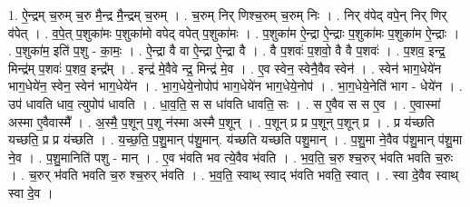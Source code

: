 \documentclass[17pt]{extarticle}
\begin{document}
1. ऐ॒न्द्रम् च॒रुम् च॒रु मै॒न्द्र मै॒न्द्रम् च॒रुम् । . च॒रुम् निर् णिश्च॒रुम् च॒रुम् निः । . निर् व॑पेद् वपे॒न् निर् णिर् व॑पेत् । . व॒पे॒त् प॒शुका॑मः प॒शुका॑मो वपेद् वपेत् प॒शुका॑मः । . प॒शुका॑म ऐ॒न्द्रा ऐ॒न्द्राः प॒शुका॑मः प॒शुका॑म ऐ॒न्द्राः । . प॒शुका॑म॒ इति॑ प॒शु - का॒मः॒ । . ऐ॒न्द्रा वै वा ऐ॒न्द्रा ऐ॒न्द्रा वै । . वै प॒शवः॑ प॒शवो॒ वै वै प॒शवः॑ । . प॒शव॒ इन्द्र॒ मिन्द्र॑म् प॒शवः॑ प॒शव॒ इन्द्र᳚म् । . इन्द्र॑ मे॒वैवे न्द्र॒ मिन्द्र॑ मे॒व । . ए॒व स्वेन॒ स्वेनै॒वैव स्वेन॑ । . स्वेन॑ भाग॒धेये॑न भाग॒धेये॑न॒ स्वेन॒ स्वेन॑ भाग॒धेये॑न । . भा॒ग॒धेये॒नोपोप॑ भाग॒धेये॑न भाग॒धेये॒नोप॑ । . भा॒ग॒धेये॒नेति॑ भाग - धेये॑न । . उप॑ धावति धाव॒ त्युपोप॑ धावति । . धा॒व॒ति॒ स स धा॑वति धावति॒ सः । . स ए॒वैव स स ए॒व । . ए॒वास्मा॑ अस्मा ए॒वैवास्मै᳚ । . अ॒स्मै॒ प॒शून् प॒शू न॑स्मा अस्मै प॒शून् । . प॒शून् प्र प्र प॒शून् प॒शून् प्र । . प्र य॑च्छति यच्छति॒ प्र प्र य॑च्छति । . य॒च्छ॒ति॒ प॒शु॒मान् प॑शु॒मान्. य॑च्छति यच्छति पशु॒मान् । . प॒शु॒मा ने॒वैव प॑शु॒मान् प॑शु॒मा ने॒व । . प॒शु॒मानिति॑ पशु - मान् । . ए॒व भ॑वति भव त्ये॒वैव भ॑वति । . भ॒व॒ति॒ च॒रु श्च॒रुर् भ॑वति भवति च॒रुः । . च॒रुर् भ॑वति भवति च॒रु श्च॒रुर् भ॑वति । . भ॒व॒ति॒ स्वाथ् स्वाद् भ॑वति भवति॒ स्वात् । . स्वा दे॒वैव स्वाथ् स्वा दे॒व । \newline
\end{document}
